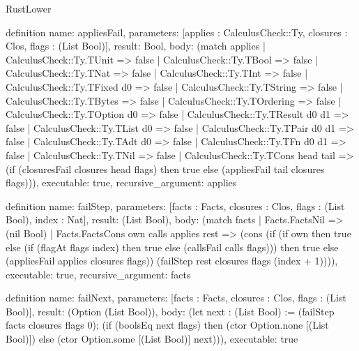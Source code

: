 \begin{lexlean}{RustLower}
\begin{semanticmodule}
definition{
  name: appliesFail,
  parameters: [applies : CalculusCheck::Ty, closures : Clos, flags : (List Bool)],
  result: Bool,
  body: (match applies
    | CalculusCheck::Ty.TUnit => false
    | CalculusCheck::Ty.TBool => false
    | CalculusCheck::Ty.TNat => false
    | CalculusCheck::Ty.TInt => false
    | CalculusCheck::Ty.TFixed d0 => false
    | CalculusCheck::Ty.TString => false
    | CalculusCheck::Ty.TBytes => false
    | CalculusCheck::Ty.TOrdering => false
    | CalculusCheck::Ty.TOption d0 => false
    | CalculusCheck::Ty.TResult d0 d1 => false
    | CalculusCheck::Ty.TList d0 => false
    | CalculusCheck::Ty.TPair d0 d1 => false
    | CalculusCheck::Ty.TAdt d0 => false
    | CalculusCheck::Ty.TFn d0 d1 => false
    | CalculusCheck::Ty.TNil => false
    | CalculusCheck::Ty.TCons head tail => (if (closuresFail closures head flags) then true else (appliesFail tail closures flags))),
  executable: true,
  recursive_argument: applies
}

definition{
  name: failStep,
  parameters: [facts : Facts, closures : Clos, flags : (List Bool), index : Nat],
  result: (List Bool),
  body: (match facts
    | Facts.FactsNil => (nil Bool)
    | Facts.FactsCons own calls applies rest => (cons (if (if own then true else (if (flagAt flags index) then true else (callsFail calls flags))) then true else (appliesFail applies closures flags)) (failStep rest closures flags (index + 1)))),
  executable: true,
  recursive_argument: facts
}

definition{
  name: failNext,
  parameters: [facts : Facts, closures : Clos, flags : (List Bool)],
  result: (Option (List Bool)),
  body: (let next : (List Bool) := (failStep facts closures flags 0); (if (boolsEq next flags) then (ctor Option.none [(List Bool)]) else (ctor Option.some [(List Bool)] next))),
  executable: true
}


\end{semanticmodule}
\end{lexlean}
